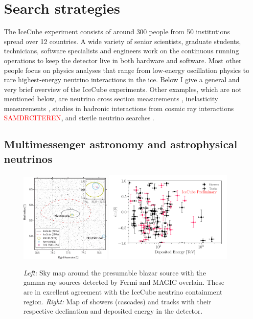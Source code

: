 \section{Search strategies}
The IceCube experiment consists of around 300 people from 50 institutions spread over 12 countries. A wide variety of senior scientists, graduate students, technicians, software specialists and engineers work on the continuous running operations to keep the detector live in both hardware and software. Most other people focus on physics analyses that range from low-energy oscillation physics to rare highest-energy neutrino interactions in the ice. Below I give a general and very brief overview of the IceCube experiments. Other examples, which are not mentioned below, are neutrino cross section measurements \cite{Aartsen:2017kpd}, inelasticity measurements \cite{Aartsen:2018vez}, studies in hadronic interactions from cosmic ray interactions \textcolor{red}{SAMDRCITEREN}, and sterile neutrino searches \cite{TheIceCube:2016oqi}.

\subsection{Multimessenger astronomy and astrophysical neutrinos}
\label{subsec:multimessenger}
\begin{figure}[t]
\centering
\includegraphics[width=0.4\textwidth]{chapter5/img/blazar.jpg}
\includegraphics[width=0.57\textwidth]{chapter5/img/highenergyevents.png}
\caption{\textit{Left:} Sky map around the presumable blazar source with the gamma-ray sources detected by Fermi and MAGIC overlain. These are in excellent agreement with the IceCube neutrino containment region. \textit{Right:} Map of showers (cascades) and tracks with their respective declination and deposited energy in the detector.}
\label{fig:blazarandastro}
\end{figure}

